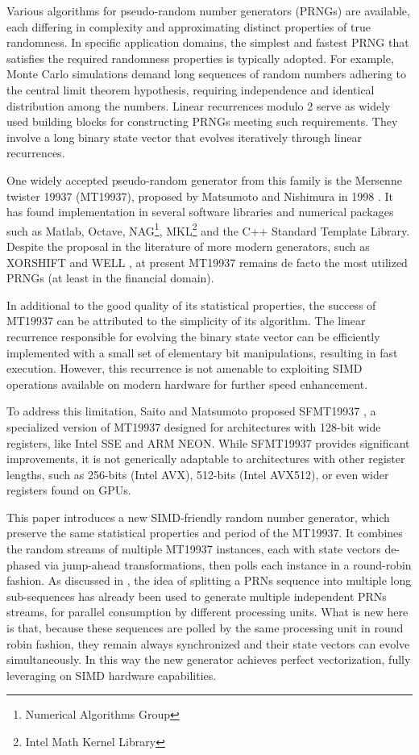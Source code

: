 \documentclass[preprint,1p,times]{elsarticle}
\begin{document}
	Various algorithms for pseudo-random number generators (PRNGs) are available, each differing in complexity and approximating distinct properties of true randomness. In specific application domains, the simplest and fastest PRNG that satisfies the required randomness properties is typically adopted. For example, Monte Carlo simulations demand long sequences of random numbers adhering to the central limit theorem hypothesis, requiring independence and identical distribution among the numbers. Linear recurrences modulo 2 serve as widely used building blocks for constructing PRNGs meeting such requirements. They involve a long binary state vector that evolves iteratively through linear recurrences.
	
	One widely accepted pseudo-random generator from this family is the Mersenne twister 19937 (MT19937), proposed by Matsumoto and Nishimura in 1998 \cite{mt19937}. It has found implementation in several software libraries and numerical packages such as Matlab, Octave, NAG\footnote{Numerical Algorithms Group}, MKL\footnote{Intel Math Kernel Library} and the C++ Standard Template Library. Despite the proposal in the literature of more modern generators, such as XORSHIFT \cite{xorshift} and WELL \cite{well}, at present MT19937 remains de facto the most utilized PRNGs (at least in the financial domain).
	
	In additional to the good quality of its statistical properties, the success of MT19937 can be attributed to the simplicity of its algorithm. The linear recurrence responsible for evolving the binary state vector can be efficiently implemented with a small set of elementary bit manipulations, resulting in fast execution. However, this recurrence is not amenable to exploiting SIMD operations available on modern hardware for further speed enhancement.
	
	To address this limitation, Saito and Matsumoto proposed SFMT19937 \cite{sfmt19937}, a specialized version of MT19937 designed for architectures with 128-bit wide registers, like Intel SSE and ARM NEON. While SFMT19937 provides significant improvements, it is not generically adaptable to architectures with other register lengths, such as 256-bits (Intel AVX), 512-bits (Intel AVX512), or even wider registers found on GPUs.
	
	This paper introduces a new SIMD-friendly random number generator, which preserve the same statistical properties and period of the MT19937. It combines the random streams of multiple MT19937 instances, each with state vectors de-phased via jump-ahead transformations, then polls each instance in a round-robin fashion. As discussed in \cite{multistream}, the idea of splitting a PRNs sequence into multiple long sub-sequences has already been used to generate multiple independent PRNs streams, for parallel consumption by different processing units. What is new here is that, because these sequences are polled by the same processing unit in round robin fashion, they remain always synchronized and their state vectors can evolve simultaneously. In this way the new generator achieves perfect vectorization, fully leveraging on SIMD hardware capabilities.
	
\end{document}
